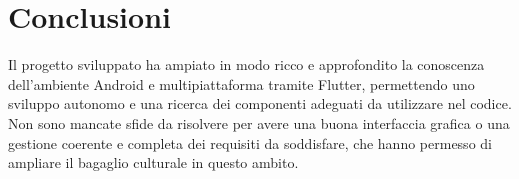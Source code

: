 \documentclass{article}
\begin{document}
\section{Conclusioni}
Il progetto sviluppato ha ampiato in modo ricco e approfondito la conoscenza dell'ambiente Android e multipiattaforma tramite Flutter, permettendo uno sviluppo autonomo e una ricerca dei componenti adeguati da utilizzare nel codice.
Non sono mancate sfide da risolvere per avere una buona interfaccia grafica o una gestione coerente e completa dei requisiti da soddisfare, che hanno permesso di ampliare il bagaglio culturale in questo ambito.
\end{document}
